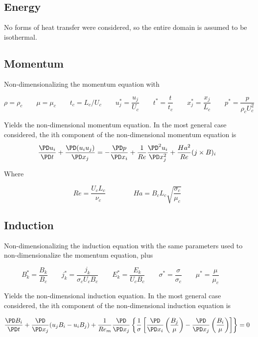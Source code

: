 \documentclass[11pt]{article}
\begin{document}
\subsection{Energy}
No forms of heat transfer were considered, so the entire domain is assumed to be isothermal.

\subsection{Momentum}
Non-dimensionalizing the momentum equation with

\begin{equation}
	\rho = \rho_c \qquad
	\mu = \mu_c \qquad
	t_c = L_c/U_c \qquad
	u_j^* = \frac{u_j}{U_c} \qquad
	t^* = \frac{t}{t_c} \qquad
	x_j^* = \frac{x_j}{L_c} \qquad
	p^* = \frac{p}{\rho_c U_c^2} \qquad
\end{equation}

Yields the non-dimensional momentum equation. In the most general case considered, the ith component of the non-dimensional momentum equation is
\begin{equation}
	\frac{\PD u_i}{\PD t} +
	\frac{\PD (u_i u_j)}{\PD x_j}
	=
	- \frac{\PD p}{\PD x_i}
	+ \frac{1}{Re}
	\frac{\PD^2 u_i}{\PD x_j^2}
	+ \frac{Ha^2}{Re}
	(j \times B)_i
\end{equation}

Where

\begin{equation}
	Re = \frac{U_c L_c}{\nu_c}
	\qquad \qquad
	Ha = B_c L_c \sqrt{\frac{\sigma_c}{\mu_c}}
\end{equation}

\subsection{Induction}
Non-dimensionalizing the induction equation with the same parameters used to non-dimensionalize the momentum equation, plus

\begin{equation}
	B_k^* = \frac{B_k}{B_c}  \qquad
	j_k^* = \frac{j_k}{\sigma_c U_c B_c} \qquad
	E_k^* = \frac{E_k}{U_c B_c} \qquad
	\sigma^* = \frac{\sigma}{\sigma_c} \qquad
	\mu^* = \frac{\mu}{\mu_c} \qquad
\end{equation}

Yields the non-dimensional induction equation. In the most general case considered, the ith component of the non-dimensional induction equation is

\begin{equation}
	\frac{\PD B_i}{\PD t}
	+ \frac{\PD}{\PD x_j} (u_j B_i - u_i B_j)
	+ \frac{1}{Re_m}
	\frac{\PD}{\PD x_j}
	\left\{ \frac{1}{\sigma}
	\left[
	\frac{\PD}{\PD x_i}
	\left( \frac{B_j}{\mu} \right) -
	\frac{\PD}{\PD x_j}
	\left( \frac{B_i}{\mu} \right)
	\right]
	\right\} = 0
\end{equation}
\end{document}
